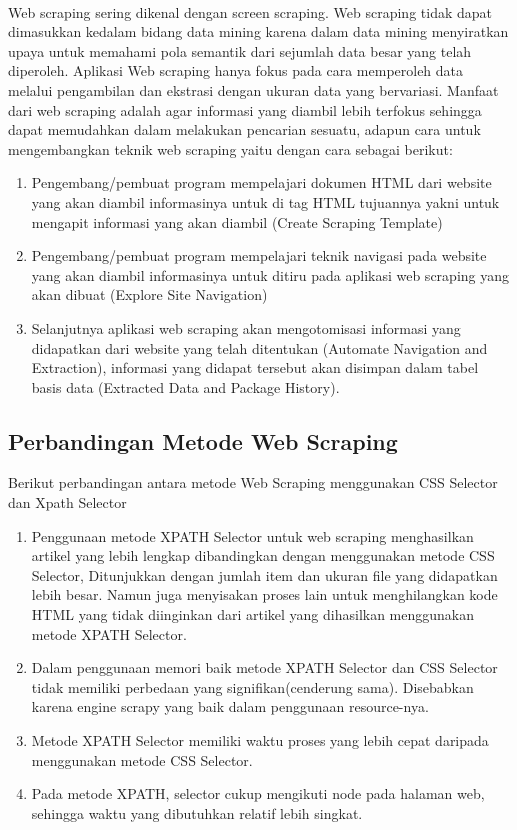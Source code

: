 \documentclass[12pt, a4paper]{article}
\begin{document}
\paragraph{}Web scraping sering dikenal dengan screen scraping. Web scraping tidak dapat dimasukkan kedalam bidang data
mining karena dalam data mining menyiratkan upaya untuk memahami pola semantik dari sejumlah data besar yang
telah diperoleh. Aplikasi Web scraping hanya fokus pada cara memperoleh data melalui pengambilan dan ekstrasi
dengan ukuran data yang bervariasi. Manfaat dari web scraping adalah agar informasi yang diambil lebih
terfokus sehingga dapat memudahkan dalam melakukan pencarian sesuatu, adapun cara untuk mengembangkan teknik
web scraping yaitu dengan cara sebagai berikut:
\begin{enumerate}
\item Pengembang/pembuat program mempelajari dokumen HTML dari website yang akan diambil informasinya untuk
	  di tag HTML tujuannya yakni untuk mengapit informasi yang akan diambil (Create Scraping Template)
\item Pengembang/pembuat program mempelajari teknik navigasi pada website yang akan diambil informasinya
	   untuk ditiru pada aplikasi web scraping yang akan dibuat (Explore Site Navigation)
\item Selanjutnya aplikasi web scraping akan mengotomisasi informasi yang didapatkan dari website yang telah
	   ditentukan (Automate Navigation and Extraction), informasi yang didapat tersebut akan disimpan dalam 
	   tabel basis data (Extracted Data and Package History).
\end{enumerate}

\subsection{Perbandingan Metode Web Scraping}
Berikut perbandingan antara metode Web Scraping menggunakan CSS Selector dan Xpath Selector
\begin{enumerate}
\item Penggunaan metode XPATH Selector untuk web scraping menghasilkan artikel yang lebih lengkap
	  dibandingkan dengan menggunakan metode CSS Selector, Ditunjukkan dengan jumlah item dan ukuran file
	  yang didapatkan lebih besar. Namun juga menyisakan proses lain untuk menghilangkan kode HTML yang tidak
	  diinginkan dari artikel yang dihasilkan menggunakan metode XPATH Selector.
\item Dalam penggunaan memori baik metode XPATH Selector dan CSS Selector tidak memiliki perbedaan yang
	  signifikan(cenderung sama). Disebabkan karena engine scrapy yang baik dalam penggunaan resource-nya. 
\item Metode XPATH Selector memiliki waktu proses yang lebih cepat daripada menggunakan metode CSS Selector.
\item Pada metode XPATH, selector cukup mengikuti node pada halaman web, sehingga waktu yang dibutuhkan
	  relatif lebih singkat.
\end{enumerate}
\end{document}
